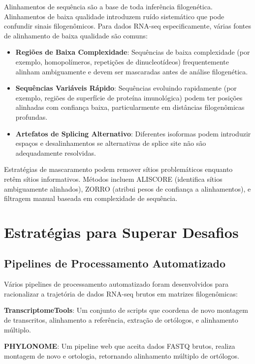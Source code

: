 Alinhamentos de sequência são a base de toda inferência filogenética. Alinhamentos de baixa qualidade introduzem ruído sistemático que pode confundir sinais filogenômicos. Para dados RNA-seq especificamente, várias fontes de alinhamento de baixa qualidade são comuns:

\begin{itemize}
\item \textbf{Regiões de Baixa Complexidade}: Sequências de baixa complexidade (por exemplo, homopolímeros, repetições de dinucleotídeos) frequentemente alinham ambiguamente e devem ser mascaradas antes de análise filogenética.

\item \textbf{Sequências Variáveis Rápido}: Sequências evoluindo rapidamente (por exemplo, regiões de superfície de proteína imunológica) podem ter posições alinhadas com confiança baixa, particularmente em distâncias filogenômicas profundas.

\item \textbf{Artefatos de Splicing Alternativo}: Diferentes isoformas podem introduzir espaços e desalinhamentos se alternativas de splice site não são adequadamente resolvidas.
\end{itemize}

Estratégias de mascaramento podem remover sítios problemáticos enquanto retêm sítios informativos. Métodos incluem ALISCORE (identifica sítios ambiguamente alinhados), ZORRO (atribui pesos de confiança a alinhamentos), e filtragem manual baseada em complexidade de sequência.

\section{Estratégias para Superar Desafios}

\subsection{Pipelines de Processamento Automatizado}

Vários pipelines de processamento automatizado foram desenvolvidos para racionalizar a trajetória de dados RNA-seq brutos em matrizes filogenômicas:

\textbf{TranscriptomeTools}: Um conjunto de scripts que coordena de novo montagem de transcritos, alinhamento a referência, extração de ortólogos, e alinhamento múltiplo.

\textbf{PHYLONOME}: Um pipeline web que aceita dados FASTQ brutos, realiza montagem de novo e ortologia, retornando alinhamento múltiplo de ortólogos.

